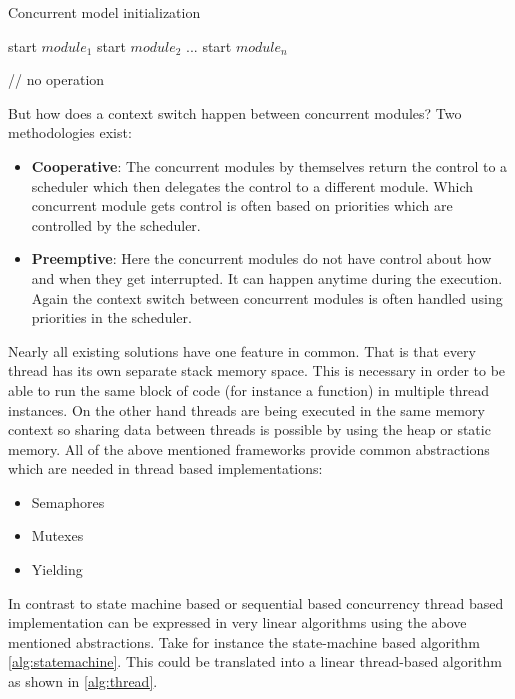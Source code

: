 \begin{algorithm}[H]
\caption{Concurrent model initialization}
\label{alg:threads}
\begin{algorithmic}

\STATE start $module_1$
\STATE start $module_2$
\STATE ...
\STATE start $module_n$

    \STATE // no operation
\ENDWHILE
\end{algorithmic}
\end{algorithm}

But how does a context switch happen between concurrent modules? Two methodologies exist:

\begin{itemize}
    \item \textbf{Cooperative}: The concurrent modules by themselves return the control to a scheduler which then delegates the control to a different module. Which concurrent module gets control is often based on priorities which are controlled by the scheduler.
    \item \textbf{Preemptive}: Here the concurrent modules do not have control about how and when they get interrupted. It can happen anytime during the execution. Again the context switch between concurrent modules is often handled using priorities in the scheduler.
\end{itemize}

Nearly all existing solutions have one feature in common. That is that every thread has its own separate stack memory space. This is necessary in order to be able to run the same block of code (for instance a function) in multiple thread instances. On the other hand threads are being executed in the same memory context so sharing data between threads is possible by using the heap or static memory. All of the above mentioned frameworks provide common abstractions which are needed in thread based implementations:

\begin{itemize}
    \item Semaphores
    \item Mutexes
    \item Yielding
\end{itemize}

In contrast to state machine based or sequential based concurrency thread based implementation can be expressed in very linear algorithms using the above mentioned abstractions. Take for instance the state-machine based algorithm \ref{alg:statemachine}. This could be translated into a linear thread-based algorithm as shown in \ref{alg:thread}.

